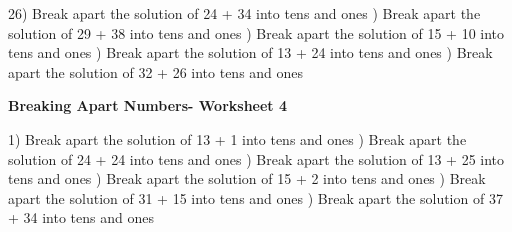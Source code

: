 \documentclass{article}%
\begin{document}
26) Break apart the solution of 24 + 34 into tens and ones%
\newline%
\newline%
) Break apart the solution of 29 + 38 into tens and ones%
\newline%
\newline%
) Break apart the solution of 15 + 10 into tens and ones%
\newline%
\newline%
) Break apart the solution of 13 + 24 into tens and ones%
\newline%
\newline%
) Break apart the solution of 32 + 26 into tens and ones%
\newline%
\newline%
\newline%
\pagebreak%
\large%
\begin{center}%
\textbf{Breaking Apart Numbers- Worksheet 4}%
\newline%
\newline%
\newline%
\end{center} \normalsize%
1) Break apart the solution of 13 + 1 into tens and ones%
\newline%
\newline%
) Break apart the solution of 24 + 24 into tens and ones%
\newline%
\newline%
) Break apart the solution of 13 + 25 into tens and ones%
\newline%
\newline%
) Break apart the solution of 15 + 2 into tens and ones%
\newline%
\newline%
) Break apart the solution of 31 + 15 into tens and ones%
\newline%
\newline%
) Break apart the solution of 37 + 34 into tens and ones%
\newline%
\newline%
\newline%
\end{document}

